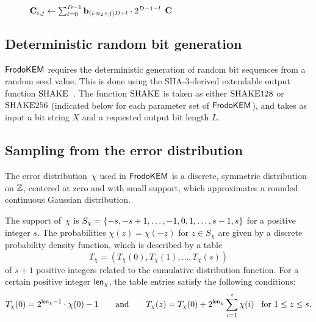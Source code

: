 \begin{figure}[h!]
\begin{minipage}[t]{0.5\textwidth}
\begin{algorithm}[H]
\vspace{-0.5cm}
\begin{algorithmic}[1]
    \STATE $\mathbf{C}_{i,j} \gets \sum_{l=0}^{D-1}\mathbf{b}_{(i\cdot n_2  + j)D+l}\cdot 2^{D-1-l}$
    \ENDFOR
    \ENDFOR
    \RETURN $\mathbf{C}$
\end{algorithmic}
\end{algorithm}
\end{minipage}
\end{figure}

\subsection{Deterministic random bit generation}\label{sec:rbg}

$\textsf{\upshape\mdseries FrodoKEM}$ requires the deterministic generation of random bit
sequences from a random seed value. This is done using the
SHA-3-derived extendable output function
$\textrm{\upshape\mdseries SHAKE}$~\cite{dworkin2015sha}. The function $\textrm{\upshape\mdseries SHAKE}$ is taken as
either $\textrm{\upshape\mdseries SHAKE}128$ or $\textrm{\upshape\mdseries SHAKE}256$ (indicated below for each
parameter set of $\textsf{\upshape\mdseries FrodoKEM}$), and takes as input a bit string $X$ and a
requested output bit length $L$.

\subsection{Sampling from the error distribution}\label{sec:sampling}

The error distribution~$\chi$ used in $\textsf{\upshape\mdseries FrodoKEM}$ is a discrete,
symmetric distribution on $\mathbb{Z}$, centered at zero and with small
support, which approximates a rounded continuous Gaussian
distribution.

The support of~$\chi$ is
$S_{\chi}=\{-s, -s+1, \dots, -1, 0, 1, \dots, s-1, s\}$ for a
positive integer $s$. The probabilities $\chi(z) = \chi(-z)$ for
$z \in S_{\chi}$ are given by a discrete probability density function,
which is described by a table
\[ T_{\chi} = (T_{\chi}(0), T_{\chi}(1), \dots, T_{\chi}(s)) \] of
$s+1$ positive integers related to the cumulative distribution function.  For a
certain positive integer ${\mathsf{len}_{\chi}}$, the table entries satisfy the
following conditions:
\[ T_{\chi}(0) = 2^{{\mathsf{len}_{\chi}}-1}\cdot \chi(0)-1 \quad\quad \textrm{and} \quad\quad
  T_{\chi}(z) = T_{\chi}(0) + 2^{{\mathsf{len}_{\chi}}}\sum_{i=1}^z\chi(i) \enspace \textrm{ for
  } 1 \leq z \leq s. \]

